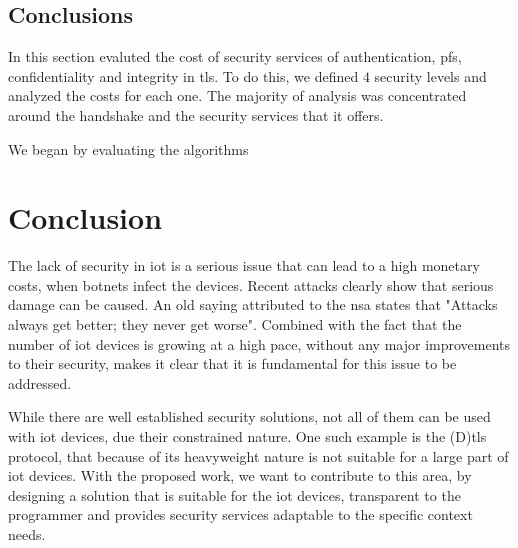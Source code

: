 \documentclass{llncs}
\begin{document}
\subsection{Conclusions} \label{sec:ss-cost-conclusions}

In this section evaluted the cost of security services of authentication, \gls{pfs}, confidentiality and integrity
in \gls{tls}. To do this, we defined $4$ security levels and analyzed the costs for each one. The majority of
analysis was concentrated around the handshake and the security services that it offers.

We began by evaluating the algorithms 

\section{Conclusion}

The lack of security in \gls{iot} is a serious issue that can lead to a high monetary costs,
when botnets infect the devices. Recent
attacks clearly show that serious damage can be caused. An old saying attributed to the
\gls{nsa} states that "Attacks always get better; they never get worse".
Combined with the fact that the number of \gls{iot} devices is growing at a high
pace, without any major improvements to their security, makes it clear
that it is fundamental for this issue to be addressed.

While there are well established security solutions, not all of them can be used
with \gls{iot} devices, due their constrained nature. One such example is
the (D)\gls{tls} protocol, that because of its heavyweight nature is not suitable for a large part of \gls{iot} devices. With the proposed work,
we want to contribute to this area, by designing a solution that is suitable for the \gls{iot} devices, transparent
to the programmer and provides security services adaptable to the specific context needs.

%
\nocite{*}


%
\printglossary[style=long]
%
\end{document}
